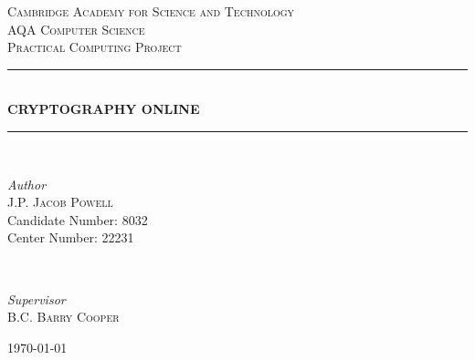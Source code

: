 %
%

\begin{titlepage}

\newcommand{\HRule}{\rule{\linewidth}{0.5mm}}

\center


\textsc{\LARGE Cambridge Academy for Science and Technology}\\[1.5cm]
\textsc{\Large AQA Computer Science}\\[0.5cm]
\textsc{\large Practical Computing Project}\\[0.5cm]


\HRule\\[0.4cm]

{\huge\bfseries \textsc{CRYPTOGRAPHY ONLINE}}\\[0.4cm]

\HRule\\[0.4cm]

\begin{minipage}{0.5\textwidth}
	\begin{flushleft}
		\large
		\textit{Author}\\
		J.P. \textsc{Jacob Powell}\\
		Candidate Number: \textsc{8032} \\
		Center Number: \textsc{22231}
	\end{flushleft}
\end{minipage}
~
\begin{minipage}{0.4\textwidth}
	\begin{flushright}
	\large
	\textit{Supervisor}\\
	B.C. \textsc{Barry Cooper}
	\end{flushright}
\end{minipage}

%
%

\vfill\vfill\vfill %
{\large\today}

%
%

\vfill

\end{titlepage}

